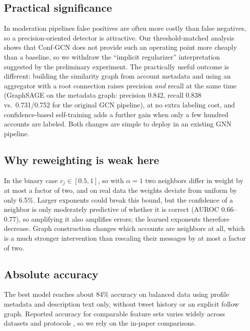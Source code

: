 \documentclass[conference]{IEEEtran}
\begin{document}
\subsection{Practical significance}
In moderation pipelines false positives are often more costly than false negatives, so a precision-oriented detector is attractive. Our threshold-matched analysis shows that Conf-GCN does not provide such an operating point more cheaply than a baseline, so we withdraw the ``implicit regularizer'' interpretation suggested by the preliminary experiment. The practically useful outcome is different: building the similarity graph from account metadata and using an aggregator with a root connection raises precision \emph{and} recall at the same time (GraphSAGE on the metadata graph: precision 0.842, recall 0.838 vs.\ 0.731/0.752 for the original GCN pipeline), at no extra labeling cost, and confidence-based self-training adds a further gain when only a few hundred accounts are labeled. Both changes are simple to deploy in an existing GNN pipeline.

\subsection{Why reweighting is weak here}
In the binary case $c_j\in[0.5,1]$, so with $\alpha=1$ two neighbors differ in weight by at most a factor of two, and on real data the weights deviate from uniform by only 6.5\%. Larger exponents could break this bound, but the confidence of a neighbor is only moderately predictive of whether it is correct (AUROC 0.66--0.77), so amplifying it also amplifies errors; the learned exponents therefore decrease. Graph construction changes which accounts are neighbors at all, which is a much stronger intervention than rescaling their messages by at most a factor of two.

\subsection{Absolute accuracy}
The best model reaches about 84\% accuracy on balanced data using profile metadata and description text only, without tweet history or an explicit follow graph. Reported accuracy for comparable feature sets varies widely across datasets and protocols \cite{yang2020scalable,lee2021discriminative}, so we rely on the in-paper comparisons.
\end{document}
